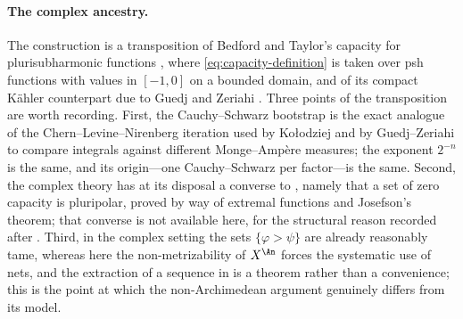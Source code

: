 \paragraph{The complex ancestry.}  The construction is a transposition of
Bedford and Taylor's capacity for plurisubharmonic functions \cite{BT82},
where \eqref{eq:capacity-definition} is taken over psh functions with values
in \([-1,0]\) on a bounded domain, and of its compact K\"ahler counterpart
due to Guedj and Zeriahi \cite{GZ05}.  Three points of the transposition are
worth recording.  First, the Cauchy--Schwarz bootstrap
 is the exact analogue of the
Chern--Levine--Nirenberg iteration used by Ko\l odziej \cite{Kol98} and by
Guedj--Zeriahi \cite{GZ05,GZ07} to compare integrals against different
Monge--Amp\`ere measures; the exponent \(2^{-n}\) is the same, and its
origin---one Cauchy--Schwarz per factor---is the same.  Second, the complex
theory has at its disposal a converse to
, namely that a set of zero capacity is
pluripolar, proved by way of extremal functions and Josefson's theorem; that
converse is not available here, for the structural reason recorded after
.  Third, in the complex setting the sets
\(\{\varphi>\psi\}\) are already reasonably tame, whereas here the
non-metrizability of \(X^{\An}\) forces the systematic use of nets, and the
extraction of a sequence in
 is a theorem rather than a convenience;
this is the point at which the non-Archimedean argument genuinely differs
from its model.

